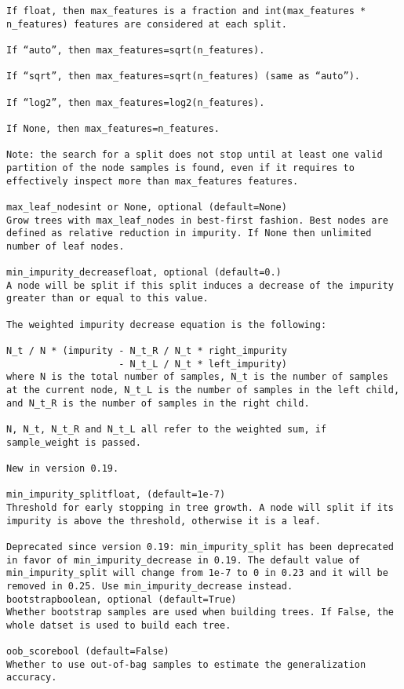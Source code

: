 \documentclass[12pt]{article}
\begin{document}
\begin{verbatim}
If float, then max_features is a fraction and int(max_features * n_features) features are considered at each split.

If “auto”, then max_features=sqrt(n_features).

If “sqrt”, then max_features=sqrt(n_features) (same as “auto”).

If “log2”, then max_features=log2(n_features).

If None, then max_features=n_features.

Note: the search for a split does not stop until at least one valid partition of the node samples is found, even if it requires to effectively inspect more than max_features features.

max_leaf_nodesint or None, optional (default=None)
Grow trees with max_leaf_nodes in best-first fashion. Best nodes are defined as relative reduction in impurity. If None then unlimited number of leaf nodes.

min_impurity_decreasefloat, optional (default=0.)
A node will be split if this split induces a decrease of the impurity greater than or equal to this value.

The weighted impurity decrease equation is the following:

N_t / N * (impurity - N_t_R / N_t * right_impurity
                    - N_t_L / N_t * left_impurity)
where N is the total number of samples, N_t is the number of samples at the current node, N_t_L is the number of samples in the left child, and N_t_R is the number of samples in the right child.

N, N_t, N_t_R and N_t_L all refer to the weighted sum, if sample_weight is passed.

New in version 0.19.

min_impurity_splitfloat, (default=1e-7)
Threshold for early stopping in tree growth. A node will split if its impurity is above the threshold, otherwise it is a leaf.

Deprecated since version 0.19: min_impurity_split has been deprecated in favor of min_impurity_decrease in 0.19. The default value of min_impurity_split will change from 1e-7 to 0 in 0.23 and it will be removed in 0.25. Use min_impurity_decrease instead.
bootstrapboolean, optional (default=True)
Whether bootstrap samples are used when building trees. If False, the whole datset is used to build each tree.

oob_scorebool (default=False)
Whether to use out-of-bag samples to estimate the generalization accuracy.


\end{verbatim}
\end{document}

